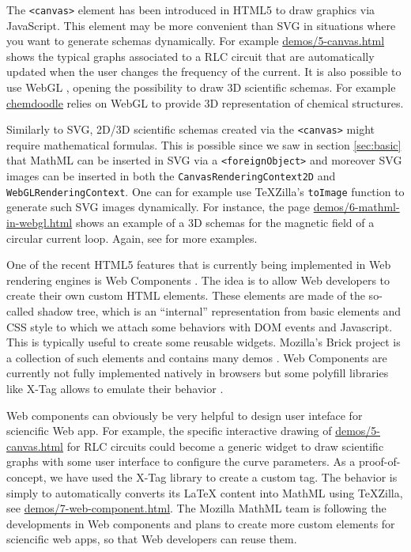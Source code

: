 The {\tt <canvas>} element has been introduced in HTML5 to draw graphics via
JavaScript. This element may be more convenient than SVG in situations where
you want to generate schemas dynamically. For example \href{http://fred-wang.github.io/MathUI2014/demos/5-canvas.html}{demos/5-canvas.html}
shows the typical graphs associated to a RLC circuit that are automatically
updated when the user changes the frequency of the current. It is also possible
to use WebGL \cite{WebGLspec},
opening the possibility to draw 3D scientific schemas. For example
\href{http://www.chemdoodle.com/}{chemdoodle}
relies on WebGL to provide 3D representation of chemical structures.

Similarly to SVG, 2D/3D scientific schemas created via the {\tt <canvas>} might
require mathematical formulas. This is possible since we saw in section
\ref{sec:basic} that MathML can be
inserted in SVG via a {\tt <foreignObject>} and moreover SVG images can be
inserted in both the {\tt CanvasRenderingContext2D} and
{\tt WebGLRenderingContext}. One
can for example use TeXZilla's {\tt toImage} function to generate such SVG
images dynamically. For instance,
the page \href{http://fred-wang.github.io/MathUI2014/demos/6-mathml-in-webgl.html}{demos/6-mathml-in-webgl.html} shows an
example of a 3D schemas for the magnetic field of a circular current loop.
Again, see \cite{MathInEbooks} for more examples.

One of the recent HTML5 features that is currently being implemented in Web
rendering engines is Web Components \cite{WebComponents}.
The idea is to allow Web developers to
create their own custom HTML elements. These elements are made of the so-called
shadow tree, which is an ``internal'' representation from basic elements and CSS
style to which we attach some behaviors with DOM events and Javascript. This is
typically useful to create some reusable widgets. Mozilla's Brick project
is a collection of such elements and contains many demos \cite{Brick}.
Web Components are currently
not fully implemented natively in browsers but some polyfill libraries like
X-Tag allows to emulate their behavior \cite{XTag}.

Web components can obviously be very helpful to design user inteface for
sciencific Web app. For example, the specific interactive drawing of
\href{http://fred-wang.github.io/MathUI2014/demos/5-canvas.html}{demos/5-canvas.html} for RLC circuits could become a generic widget 
{\tt <x-graph>} to draw scientific graphs with some user interface to
configure the curve parameters. As a proof-of-concept, we have used the X-Tag
library to create a custom {\tt <x-tex>} tag. The behavior is simply to
automatically converts its LaTeX content into MathML using TeXZilla, see
\href{http://fred-wang.github.io/MathUI2014/demos/7-web-component.html}{demos/7-web-component.html}.
The Mozilla MathML team is following the developments in Web components and
plans to create more custom elements for sciencific web apps, so that Web
developers can reuse them.
